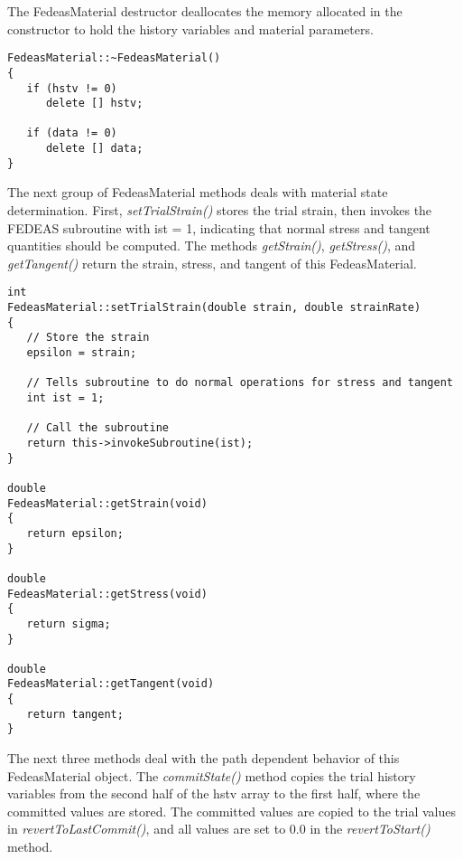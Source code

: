 \documentclass[12pt]{article}
\begin{document}
\noindent The FedeasMaterial destructor deallocates the memory allocated in the constructor
to hold the history variables and material parameters.

{\sf\small
\begin{verbatim}
FedeasMaterial::~FedeasMaterial()
{
   if (hstv != 0)
      delete [] hstv;
     
   if (data != 0)
      delete [] data;
}
\end{verbatim}
}

\noindent The next group of FedeasMaterial methods deals with material state determination.
First, {\em setTrialStrain()} stores the trial strain, then invokes the FEDEAS
subroutine with ist = 1, indicating that normal stress and tangent quantities should
be computed. The methods {\em getStrain()}, {\em getStress()}, and {\em getTangent()}
return the strain, stress, and tangent of this FedeasMaterial.

{\sf\small
\begin{verbatim}
int
FedeasMaterial::setTrialStrain(double strain, double strainRate)
{
   // Store the strain
   epsilon = strain;
     
   // Tells subroutine to do normal operations for stress and tangent
   int ist = 1;
     
   // Call the subroutine
   return this->invokeSubroutine(ist);
}

double
FedeasMaterial::getStrain(void)
{
   return epsilon;
}

double
FedeasMaterial::getStress(void)
{
   return sigma;
}

double
FedeasMaterial::getTangent(void)
{
   return tangent;
}
\end{verbatim}
}

\noindent The next three methods deal with the path dependent behavior of this
FedeasMaterial object. The {\em commitState()} method copies the trial history variables
from the second half of the hstv array to the first half, where the committed values are
stored. The committed values are copied to the trial values in {\em revertToLastCommit()},
and all values are set to $0.0$ in the {\em revertToStart()} method.
\end{document}
